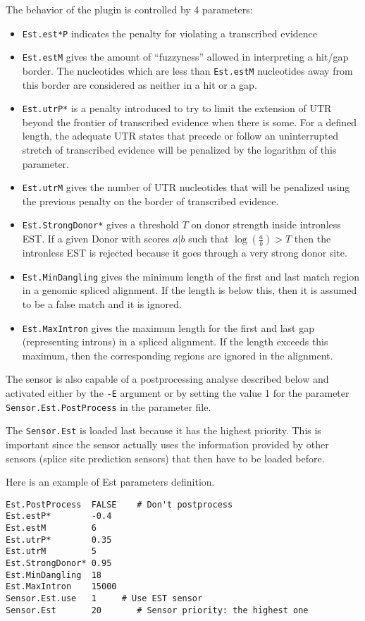 The behavior of the plugin is controlled by 4 parameters:
\begin{itemize}
\item \texttt{Est.est*P} indicates the penalty for violating a transcribed
  evidence
\item \texttt{Est.estM} gives the amount of ``fuzzyness'' allowed in
  interpreting a hit/gap border. The nucleotides which are less than
  \texttt{Est.estM} nucleotides away from this border are considered
  as neither in a hit or a gap.
\item \texttt{Est.utrP*} is a penalty introduced to try to limit the
  extension of UTR beyond the frontier of transcribed evidence when
  there is some. For a defined length, the adequate UTR states that
  precede or follow an uninterrupted stretch of transcribed evidence
  will be penalized by the logarithm of this parameter.
\item \texttt{Est.utrM} gives the number of UTR nucleotides that will
  be penalized using the previous penalty on the border of transcribed
  evidence.
\item \texttt{Est.StrongDonor*} gives a threshold $T$ on donor strength
  inside intronless EST. If a given Donor with scores $a|b$ such that
  $\log(\frac{a}{b}) >T$ then the intronless EST is rejected because
  it goes through a very strong donor site.
  \item \texttt{Est.MinDangling} gives the minimum length of the first and last
  match region in a genomic spliced alignment. If the length is below this, then it is assumed to be a false match and
it is ignored.
\item \texttt{Est.MaxIntron} gives the maximum length for the first and last gap (representing introns) in
a spliced alignment. If the length exceeds this maximum, then the corresponding regions are
ignored in the alignment.
\end{itemize}

The sensor is also capable of a postprocessing analyse described below
and activated either by the \texttt{-E} argument or by setting the value
1 for the parameter \texttt{Sensor.Est.PostProcess} in the parameter
file.

The \texttt{Sensor.Est} is loaded last because it has the highest priority.
This is important since the sensor actually uses the information
provided by other sensors (splice site prediction sensors) that then have to be loaded before.

Here is an example of Est parameters definition.
\begin{Verbatim}[fontsize=\small]
Est.PostProcess  FALSE    # Don't postprocess
Est.estP*        -0.4
Est.estM         6
Est.utrP*        0.35
Est.utrM         5
Est.StrongDonor* 0.95
Est.MinDangling  18
Est.MaxIntron    15000
Sensor.Est.use   1     # Use EST sensor
Sensor.Est       20       # Sensor priority: the highest one
\end{Verbatim}


